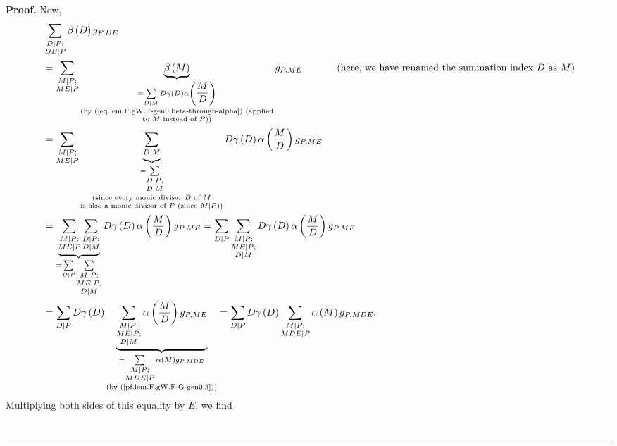 \documentclass[numbers=enddot,12pt,final,onecolumn,notitlepage]{scrartcl}%
\theoremstyle{definition}
\newenvironment{proof}[1][Proof]{\noindent\textbf{#1.} }{\ \rule{0.5em}{0.5em}}
\let\sumnonlimits\sum
\renewcommand{\sum}{\sumnonlimits\limits}
\begin{document}
\begin{proof}
Now,%
\begin{align*}
&  \sum_{\substack{D\mid P;\\DE\mid P}}\beta\left(  D\right)  g_{P,DE}\\
&  =\sum_{\substack{M\mid P;\\ME\mid P}}\underbrace{\beta\left(  M\right)
}_{\substack{=\sum_{D\mid M}D\gamma\left(  D\right)  \alpha\left(  \dfrac
{M}{D}\right)  \\\text{(by (\ref{eq.lem.F.gW.F-gen0.beta-through-alpha})
(applied}\\\text{to }M\text{ instead of }P\text{))}}}g_{P,ME}%
\ \ \ \ \ \ \ \ \ \ \left(  \text{here, we have renamed the summation index
}D\text{ as }M\right) \\
&  =\sum_{\substack{M\mid P;\\ME\mid P}}\underbrace{\sum_{D\mid M}%
}_{\substack{=\sum_{\substack{D\mid P;\\D\mid M}}\\\text{(since every monic
divisor }D\text{ of }M\\\text{is also a monic divisor of }P\text{ (since
}M\mid P\text{))}}}D\gamma\left(  D\right)  \alpha\left(  \dfrac{M}{D}\right)
g_{P,ME}\\
&  =\underbrace{\sum_{\substack{M\mid P;\\ME\mid P}}\sum_{\substack{D\mid
P;\\D\mid M}}}_{=\sum_{D\mid P}\sum_{\substack{M\mid P;\\ME\mid P;\\D\mid M}%
}}D\gamma\left(  D\right)  \alpha\left(  \dfrac{M}{D}\right)  g_{P,ME}%
=\sum_{D\mid P}\sum_{\substack{M\mid P;\\ME\mid P;\\D\mid M}}D\gamma\left(
D\right)  \alpha\left(  \dfrac{M}{D}\right)  g_{P,ME}\\
&  =\sum_{D\mid P}D\gamma\left(  D\right)  \underbrace{\sum_{\substack{M\mid
P;\\ME\mid P;\\D\mid M}}\alpha\left(  \dfrac{M}{D}\right)  g_{P,ME}%
}_{\substack{=\sum_{\substack{M\mid P;\\MDE\mid P}}\alpha\left(  M\right)
g_{P,MDE}\\\text{(by (\ref{pf.lem.F.gW.F-G-gen0.3}))}}}=\sum_{D\mid P}%
D\gamma\left(  D\right)  \sum_{\substack{M\mid P;\\MDE\mid P}}\alpha\left(
M\right)  g_{P,MDE}.
\end{align*}
Multiplying both sides of this equality by $E$, we find%
\begin{align*}

\end{align*}
\end{proof}
\end{document}
